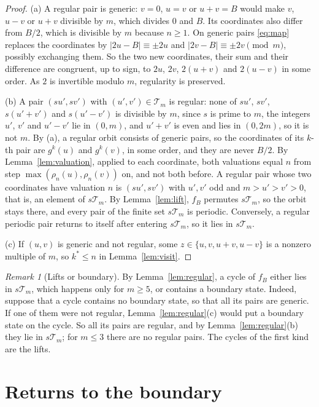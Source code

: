 \documentclass[11pt]{amsart}
\theoremstyle{definition}
\theoremstyle{remark}
\newtheorem{remark}{Remark}
\newcommand{\T}{\mathcal{T}}
\begin{document}
\begin{proof}
(a) A regular pair is generic: $v=0$, $u=v$ or $u+v=B$ would make $v$, $u-v$ or $u+v$ divisible by $m$, which divides $0$ and $B$. Its coordinates also differ from $B/2$, which is divisible by $m$ because $n\ge1$. On generic pairs \eqref{eq:map} replaces the coordinates by $|2u-B|\equiv\pm2u$ and $|2v-B|\equiv\pm2v\pmod m$, possibly exchanging them. So the two new coordinates, their sum and their difference are congruent, up to sign, to $2u$, $2v$, $2(u+v)$ and $2(u-v)$ in some order. As $2$ is invertible modulo $m$, regularity is preserved.

(b) A pair $(su',sv')$ with $(u',v')\in\T_m$ is regular: none of $su'$, $sv'$, $s(u'+v')$ and $s(u'-v')$ is divisible by $m$, since $s$ is prime to $m$, the integers $u'$, $v'$ and $u'-v'$ lie in $(0,m)$, and $u'+v'$ is even and lies in $(0,2m)$, so it is not $m$. By (a), a regular orbit consists of generic pairs, so the coordinates of its $k$-th pair are $g^k(u)$ and $g^k(v)$, in some order, and they are never $B/2$. By Lemma~\ref{lem:valuation}, applied to each coordinate, both valuations equal $n$ from step $\max(\rho_n(u),\rho_n(v))$ on, and not both before. A regular pair whose two coordinates have valuation $n$ is $(su',sv')$ with $u',v'$ odd and $m>u'>v'>0$, that is, an element of $s\T_m$. By Lemma~\ref{lem:lift}, $f_B$ permutes $s\T_m$, so the orbit stays there, and every pair of the finite set $s\T_m$ is periodic. Conversely, a regular periodic pair returns to itself after entering $s\T_m$, so it lies in $s\T_m$.

(c) If $(u,v)$ is generic and not regular, some $z\in\{u,v,u+v,u-v\}$ is a nonzero multiple of $m$, so $k^*\le n$ in Lemma~\ref{lem:visit}.
\end{proof}

\begin{remark}[Lifts or boundary]\label{rem:lob}
By Lemma~\ref{lem:regular}, a cycle of $f_B$ either lies in $s\T_m$, which happens only for $m\ge5$, or contains a boundary state. Indeed, suppose that a cycle contains no boundary state, so that all its pairs are generic. If one of them were not regular, Lemma~\ref{lem:regular}(c) would put a boundary state on the cycle. So all its pairs are regular, and by Lemma~\ref{lem:regular}(b) they lie in $s\T_m$; for $m\le3$ there are no regular pairs. The cycles of the first kind are the lifts.
\end{remark}

\section{Returns to the boundary}
\end{document}
